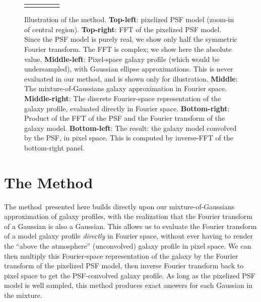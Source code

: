\documentclass[11pt,preprint]{aastex}
\newcommand{\conv}{\otimes}
\newcommand{\trick}{method}
\newcommand{\Trick}{Method}
\begin{document}
\begin{figure}
\begin{center}
\begin{tabular}{@{}c@{}c@{}c@{}c@{}c@{}}
{      }
      \\
    \end{tabular}
  \end{center}
  \caption{\label{fig:example}%
    Illustration of the \trick.
    \textbf{Top-left}: pixelized PSF model (zoom-in of central region).
    \textbf{Top-right}: 
    FFT of the pixelized PSF model.  Since the PSF model is
    purely real, we show only half the symmetric Fourier transform. The FFT is
    complex; we show here the absolute value.
    \textbf{Middle-left}: Pixel-space galaxy profile (which would be
    undersampled), with Gaussian ellipse approximations.  This is
    never evaluated in our method, and is shown only for illustration.
    \textbf{Middle}: The mixture-of-Gaussians galaxy approximation in
    Fourier space.
    \textbf{Middle-right}: The discrete Fourier-space representation of the
    galaxy profile, evaluated directly in Fourier space.
    \textbf{Bottom-right}: Product of the FFT of the PSF and the
    Fourier transform of the galaxy model.
    \textbf{Bottom-left}: The result: the galaxy model convolved by the
    PSF, in pixel space.  This is computed by inverse-FFT of the
    bottom-right panel.
  }
\end{figure}





\section{The \Trick}

The \trick\ presented here builds directly upon our mixture-of-Gaussians
approximation of galaxy profiles, with the realization that the
Fourier transform of a Gaussian is also a Gaussian.  This allows us to
evaluate the Fourier transform of a model galaxy profile \emph{directly} in Fourier
space, without ever having to render the ``above the atmosphere''
(unconvolved) galaxy profile in pixel space.
We can then multiply this Fourier-space
representation of the galaxy by the Fourier transform of the pixelized
PSF model, then inverse Fourier transform back to pixel space to get
the PSF-convolved galaxy profile.
%
As long as the pixelized PSF model is well sampled, this method produces
exact answers for each Gaussian in the mixture.
\end{document}
